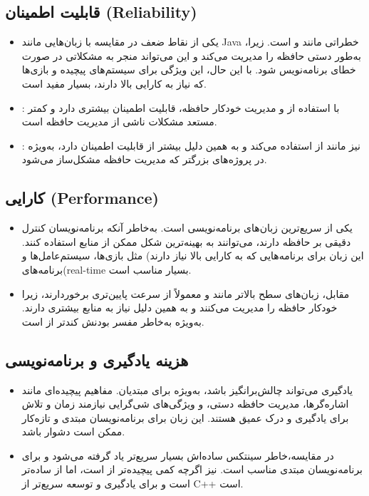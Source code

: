 \documentclass[12pt, a4paper]{report}
\begin{document}
\subsection{قابلیت اطمینان (Reliability) }
\begin{itemize}
	\item
{} یکی از نقاط ضعف در مقایسه با زبان‌هایی مانند Java ،خطراتی مانند و است. زیرا به‌طور دستی حافظه را مدیریت می‌کند و این می‌تواند منجر به مشکلاتی در صورت خطای برنامه‌نویس شود. با این حال، این ویژگی برای سیستم‌های پیچیده و بازی‌ها که نیاز به کارایی بالا دارند، بسیار مفید است.
\item
{}:   با استفاده از  و مدیریت خودکار حافظه، قابلیت اطمینان بیشتری دارد و کمتر مستعد مشکلات ناشی از مدیریت حافظه است.
\item
{}:  نیز مانند  از  استفاده می‌کند و به همین دلیل بیشتر از قابلیت اطمینان دارد، به‌ویژه در پروژه‌های بزرگتر که مدیریت حافظه مشکل‌ساز می‌شود.
\end{itemize}
\subsection{کارایی (Performance) }
\begin{itemize}
	\item
{}  یکی از سریع‌ترین زبان‌های برنامه‌نویسی است. به‌خاطر آنکه برنامه‌نویسان کنترل دقیقی بر حافظه دارند، می‌توانند به بهینه‌ترین شکل ممکن از منابع استفاده کنند. این زبان برای برنامه‌هایی که به کارایی بالا نیاز دارند) مثل بازی‌ها، سیستم‌عامل‌ها و برنامه‌های(real-time  بسیار مناسب است.
\item
{} مقابل، زبان‌های سطح بالاتر مانند   و   معمولاً از سرعت پایین‌تری برخوردارند، زیرا خودکار حافظه را مدیریت می‌کنند و به همین دلیل نیاز به منابع بیشتری دارند.  به‌ویژه به‌خاطر مفسر بودنش کندتر از  است.
\end{itemize}
\subsection{هزینه یادگیری و برنامه‌نویسی }
\begin{itemize}
	\item
{}یادگیری می‌تواند چالش‌برانگیز باشد، به‌ویژه برای مبتدیان. مفاهیم پیچیده‌ای مانند اشاره‌گرها، مدیریت حافظه دستی، و ویژگی‌های شی‌گرایی نیازمند زمان و تلاش برای یادگیری و درک عمیق هستند. این زبان برای برنامه‌نویسان مبتدی و تازه‌کار ممکن است دشوار باشد.
\item
{} در مقایسه،‌خاطر سینتکس ساده‌اش بسیار سریع‌تر یاد گرفته می‌شود و برای برنامه‌نویسان مبتدی مناسب         است.  نیز اگرچه کمی پیچیده‌تر از  است، اما از  ساده‌تر است و برای یادگیری و توسعه سریع‌تر از C++ است.
\end{itemize}
\end{document}
